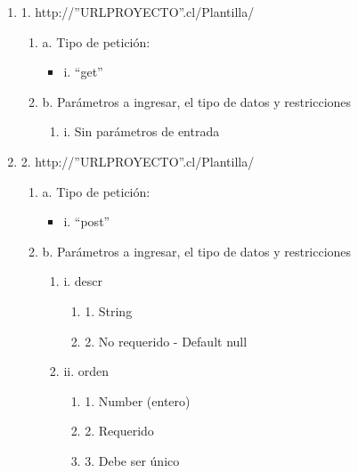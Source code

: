\begin{enumerate}
    \item 1. http://”URLPROYECTO”.cl/Plantilla/
    \begin{enumerate}
        \item a. Tipo de petición:
            \begin{itemize}
               \item i. “get”
            \end{itemize}
        \item b. Parámetros a ingresar, el tipo de datos y restricciones
            \begin{enumerate}
                \item i. Sin parámetros de entrada
            \end{enumerate}
    \end{enumerate}

    \item 2. http://”URLPROYECTO”.cl/Plantilla/
    \begin{enumerate}
        \item a. Tipo de petición:
            \begin{itemize}
               \item i. “post”
            \end{itemize}
        \item b. Parámetros a ingresar, el tipo de datos y restricciones
            \begin{enumerate}
                \item i. descr
                    \begin{enumerate}
                        \item 1. String
                        \item 2. No requerido - Default null
                    \end{enumerate}
                \item ii. orden
                    \begin{enumerate}
                        \item 1. Number (entero)
                        \item 2. Requerido
                        \item 3. Debe ser único
                    \end{enumerate}
            \end{enumerate}
    \end{enumerate}


\end{enumerate}
